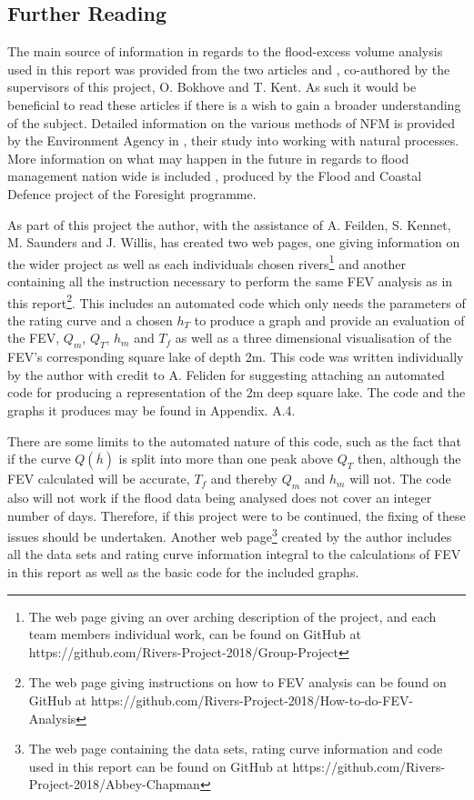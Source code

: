\documentclass[11pt,a4paper]{article}
\begin{document}
\subsection{Further Reading}
The main source of information in regards to the flood-excess volume analysis used in this report was provided from the two articles \cite{Aire} and \cite{Calder-Don}, co-authored by the supervisors of this project, O. Bokhove and T. Kent. As such it would be beneficial to read these articles if there is a wish to gain a broader understanding of the subject. Detailed information on the various methods of NFM is provided by the Environment Agency in \cite{nfm}, their study into working with natural processes. More information on what may happen in the future in regards to flood management nation wide is included \cite{foresight}, produced by the Flood and Coastal Defence project of the Foresight programme.

As part of this project the author, with the assistance of A. Feilden, S. Kennet, M. Saunders and J. Willis, has created two web pages, one giving information on the wider project as well as each individuals chosen rivers\footnote{The web page giving an over arching description of the project, and each team members individual work, can be found on GitHub at https://github.com/Rivers-Project-2018/Group-Project} and another containing all the instruction necessary to perform the same FEV analysis as in this report\footnote{The web page giving instructions on how to FEV analysis can be found on GitHub at https://github.com/Rivers-Project-2018/How-to-do-FEV-Analysis}. This includes an automated code which only needs the parameters of the rating curve and a chosen $h_T$ to produce a graph and provide an evaluation of the FEV, $Q_m$, $Q_T$, $h_m$ and $T_f$ as well as a three dimensional visualisation of the FEV's corresponding square lake of depth 2m. This code was written individually by the author with credit to A. Feliden for suggesting attaching an automated code for producing a representation of the 2m deep square lake. The code and the graphs it produces may be found in Appendix. A.4. 

There are some limits to the automated nature of this code, such as the fact that if the curve $Q(\overline{h})$ is split into more than one peak above $Q_T$ then, although the FEV calculated will be accurate, $T_f$ and thereby $Q_m$ and $h_m$ will not. The code also will not work if the flood data being analysed does not cover an integer number of days. Therefore, if this project were to be continued, the fixing of these issues should be undertaken. Another web page\footnote{The web page containing the data sets, rating curve information and code used in this report can be found on GitHub at https://github.com/Rivers-Project-2018/Abbey-Chapman} created by the author includes all the data sets and rating curve information integral to the calculations of FEV in this report as well as the basic code for the included graphs.
\end{document}
